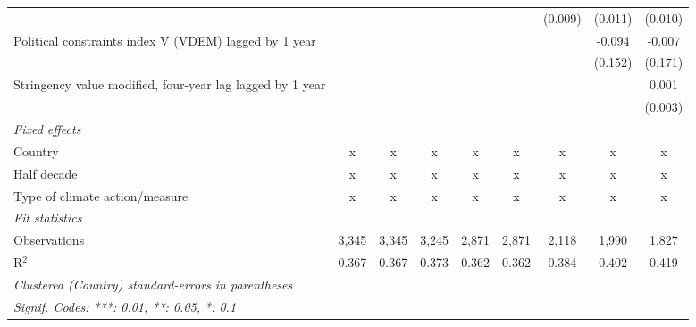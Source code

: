 \begin{tabular}{lcccccccc}
                                                             &              &              &                &                &                & (0.009)        & (0.011)        & (0.010)\\   
   Political constraints index V (VDEM) lagged by 1 year     &              &              &                &                &                &                & -0.094         & -0.007\\   
                                                             &              &              &                &                &                &                & (0.152)        & (0.171)\\   
   Stringency value modified, four-year lag lagged by 1 year &              &              &                &                &                &                &                & 0.001\\   
                                                             &              &              &                &                &                &                &                & (0.003)\\   
   \emph{Fixed effects}\\
   Country                                                   & x            & x            & x              & x              & x              & x              & x              & x\\  
   Half decade                                               & x            & x            & x              & x              & x              & x              & x              & x\\  
   Type of climate action/measure                            & x            & x            & x              & x              & x              & x              & x              & x\\  
   \midrule \emph{Fit statistics}\\
   Observations                                              & 3,345        & 3,345        & 3,245          & 2,871          & 2,871          & 2,118          & 1,990          & 1,827\\  
   R$^2$                                                     & 0.367        & 0.367        & 0.373          & 0.362          & 0.362          & 0.384          & 0.402          & 0.419\\  
   \midrule
   \multicolumn{9}{l}{\emph{Clustered (Country) standard-errors in parentheses}}\\
   \multicolumn{9}{l}{\emph{Signif. Codes: ***: 0.01, **: 0.05, *: 0.1}}\\
\end{tabular}
\par\endgroup


